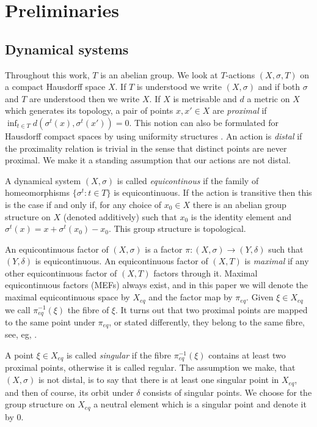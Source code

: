 \documentclass[12pt]{amsart}
\theoremstyle{definition}
\numberwithin{equation}{section}
\newcommand{\Xe}{X_{eq}}
\newcommand{\pe}{\pi_{eq}}
\begin{document}
\section{Preliminaries}\label{sec:preliminaries}
\subsection{Dynamical systems}
Throughout this work, $T$ is an abelian group. 
We look at $T$-actions $ (X,\sigma,T)$ on a compact Hausdorff space $X$. If $T$ is understood we write $(X,\sigma)$ and if both $\sigma$ and $T$ are understood then we write $X$. If $X$ is metrisable and $d$ a metric on $X$ which generates its topology,  a pair of points $x,x'\in X$ are  {\em proximal} if  $\inf_{t\in T} d(\sigma^t(x),\sigma^t(x')) = 0$. This notion can also be formulated for Hausdorff compact spaces by using uniformity structures \cite{Auslander1988}. 
An action is \emph{distal} if the proximality relation is trivial in the sense that distinct points are never proximal. We make it a standing assumption that  our actions are not distal. 


A dynamical system $(X, \sigma)$ is called  {\em equicontinous} if the family of homeomorphisms 
$\{\sigma^t : t\in T\}$ is equicontinuous.  If the action is transitive then this is the case if and only if, for any choice of $x_0\in X$ there is an abelian group structure on $X$ (denoted additively) such that $x_0$ is the identity element and $\sigma^t(x) = x+ \sigma^t(x_0)-x_0$. This group structure is topological.

An equicontinuous factor of $(X, \sigma)$ is a factor $\pi:(X, \sigma)\to (Y,\delta)$ such that $(Y,\delta)$ is equicontinuous. 
An equicontinuous factor of $(X,T)$ is {\em maximal} if any other equicontinuous factor of $(X,T)$ factors through it. Maximal equicontinuous factors (MEFs) always exist, and in this paper we will denote the maximal equicontinuous space by  $\Xe$  and the factor map by $\pe$. Given $\xi\in \Xe$ we call $\pe^{-1}(\xi)$ the fibre of $\xi$. 
It turns out that two proximal points are mapped to the same point under 
$\pe$, or stated differently, they belong to the same fibre, see, eg, \cite{ABKL}.

A point  $\xi \in \Xe$ is called {\em singular} if the fibre $\pe^{-1}(\xi)$ contains at least two proximal points, otherwise it is called regular. The assumption we make, that $(X,\sigma)$ is not distal, is to say that there is at  least one singular point in $\Xe$, and then of course, its orbit under $\delta$ consists of singular points. 
We choose for the group structure on $\Xe$ a neutral element which is a singular point and denote it by $0$. 
\end{document}
